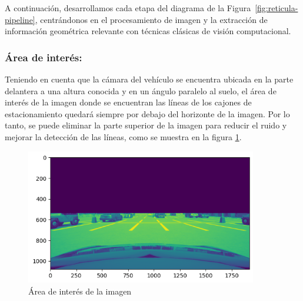\noindent
A continuación, desarrollamos cada etapa del diagrama de la Figura~\ref{fig:reticula-pipeline},
centrándonos en el procesamiento de imagen y la extracción de información geométrica relevante con técnicas clásicas de visión computacional.


\subsubsection{Área de interés:}
\noindent
Teniendo en cuenta que la cámara del vehículo se encuentra ubicada en la parte delantera a una altura conocida y en un ángulo paralelo al suelo, el área de interés de la imagen donde se encuentran las líneas de los cajones de estacionamiento quedará siempre por debajo del horizonte de la imagen.
Por lo tanto, se puede eliminar la parte superior de la imagen para
reducir el ruido y mejorar la detección de las líneas, como se muestra en la figura \ref{fig:roi}. \\
\begin{figure}[!ht]
    \centering
    \includegraphics[width=0.9\textwidth]{img/reticule/horizont}
    \caption{Área de interés de la imagen}
    \label{fig:roi}
\end{figure}

